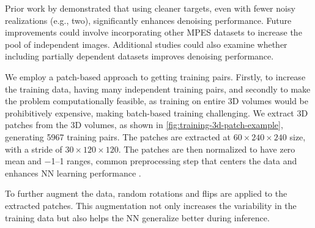 Prior work by \citeauthor{lehtinenNoise2NoiseLearningImage2018} demonstrated that using cleaner targets, even with fewer noisy realizations (e.g., two), significantly enhances denoising performance. Future improvements could involve incorporating other \gls{MPES} datasets to increase the pool of independent images. Additional studies could also examine whether including partially dependent datasets improves denoising performance.

We employ a patch-based approach to getting training pairs. Firstly, to increase the training data, having many independent training pairs, and secondly to make the problem computationally feasible, as training on entire 3D volumes would be prohibitively expensive, making batch-based training challenging. We extract 3D patches from the 3D volumes, as shown in \cref{fig:training-3d-patch-example}, generating \num{5967} training pairs. The patches are extracted at $60 \times 240 \times 240$ size, with a stride of $30 \times 120 \times 120$. The patches are then normalized to have zero mean and \numrange{-1}{1} ranges, common preprocessing step that centers the data and enhances \gls{NN} learning performance \cite{bishopDeepLearningFoundations2024}. 

To further augment the data, random rotations and flips are applied to the extracted patches. This augmentation not only increases the variability in the training data but also helps the \gls{NN} generalize better during inference.

